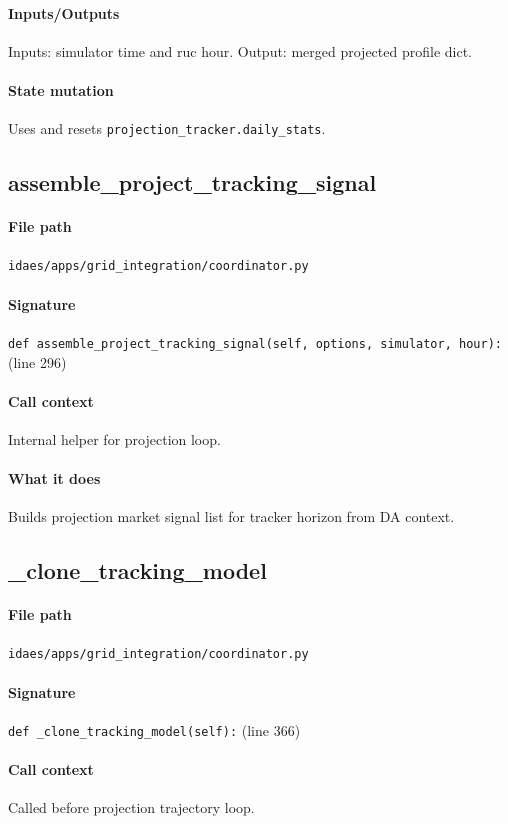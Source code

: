 \documentclass{article}
\begin{document}
\paragraph{Inputs/Outputs} Inputs: simulator time and ruc hour. Output: merged projected profile dict.
\paragraph{State mutation} Uses and resets \texttt{projection\_tracker.daily\_stats}.

\subsection{assemble\_project\_tracking\_signal}\label{fn:assemble_project_tracking_signal}
\paragraph{File path} \texttt{idaes/apps/grid\_integration/coordinator.py}
\paragraph{Signature} \texttt{def assemble\_project\_tracking\_signal(self, options, simulator, hour):} (line 296)
\paragraph{Call context} Internal helper for projection loop.
\paragraph{What it does} Builds projection market signal list for tracker horizon from DA context.

\subsection{\_clone\_tracking\_model}\label{fn:clone_tracking_model}
\paragraph{File path} \texttt{idaes/apps/grid\_integration/coordinator.py}
\paragraph{Signature} \texttt{def \_clone\_tracking\_model(self):} (line 366)
\paragraph{Call context} Called before projection trajectory loop.
\end{document}
